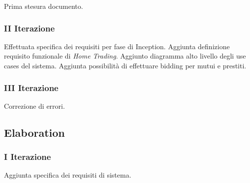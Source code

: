 \documentclass[10pt]{softeng} %
\begin{document}
Prima stesura documento.

\subsubsection{II Iterazione}

Effettuata specifica dei requisiti per fase di Inception.
Aggiunta definizione requisito funzionale di \emph{Home Trading}.
Aggiunto diagramma alto livello degli use cases del sistema.
Aggiunta possibilit\`a di effettuare bidding per mutui e prestiti.

\subsubsection{III Iterazione}

Correzione di errori.

\subsection{Elaboration}

\subsubsection{I Iterazione}

Aggiunta specifica dei requisiti di sistema.
\end{document}

